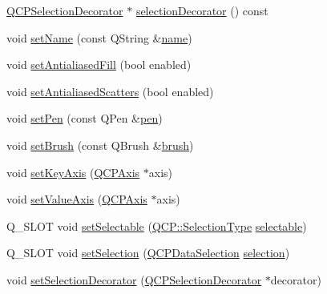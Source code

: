 \begin{DoxyCompactItemize}
\item 
\mbox{\hyperlink{class_q_c_p_selection_decorator}{Q\+C\+P\+Selection\+Decorator}} $\ast$ \mbox{\hyperlink{class_q_c_p_abstract_plottable_a7861518e47ca0c6a0c386032c2db075e}{selection\+Decorator}} () const
\item 
void \mbox{\hyperlink{class_q_c_p_abstract_plottable_ab79c7ba76bc7fa89a4b3580e12149f1f}{set\+Name}} (const Q\+String \&\mbox{\hyperlink{class_q_c_p_abstract_plottable_a52c226eefcb1920240eeabae574d28c0}{name}})
\item 
void \mbox{\hyperlink{class_q_c_p_abstract_plottable_a089d6b5577120239b55c39ed27c39536}{set\+Antialiased\+Fill}} (bool enabled)
\item 
void \mbox{\hyperlink{class_q_c_p_abstract_plottable_a2f03f067ede2ed4da6f7d0e4777a3f02}{set\+Antialiased\+Scatters}} (bool enabled)
\item 
void \mbox{\hyperlink{class_q_c_p_abstract_plottable_ab74b09ae4c0e7e13142fe4b5bf46cac7}{set\+Pen}} (const Q\+Pen \&\mbox{\hyperlink{class_q_c_p_abstract_plottable_ad5972efc31344e5a7a78ab4f8864b2d3}{pen}})
\item 
void \mbox{\hyperlink{class_q_c_p_abstract_plottable_a7a4b92144dca6453a1f0f210e27edc74}{set\+Brush}} (const Q\+Brush \&\mbox{\hyperlink{class_q_c_p_abstract_plottable_a893b4896dfd92b68b05b2600b80f5826}{brush}})
\item 
void \mbox{\hyperlink{class_q_c_p_abstract_plottable_a8524fa2994c63c0913ebd9bb2ffa3920}{set\+Key\+Axis}} (\mbox{\hyperlink{class_q_c_p_axis}{Q\+C\+P\+Axis}} $\ast$axis)
\item 
void \mbox{\hyperlink{class_q_c_p_abstract_plottable_a71626a07367e241ec62ad2c34baf21cb}{set\+Value\+Axis}} (\mbox{\hyperlink{class_q_c_p_axis}{Q\+C\+P\+Axis}} $\ast$axis)
\item 
Q\+\_\+\+S\+L\+OT void \mbox{\hyperlink{class_q_c_p_abstract_plottable_ac238d6e910f976f1f30d41c2bca44ac3}{set\+Selectable}} (\mbox{\hyperlink{namespace_q_c_p_ac6cb9db26a564b27feda362a438db038}{Q\+C\+P\+::\+Selection\+Type}} \mbox{\hyperlink{class_q_c_p_abstract_plottable_a016653741033bd332d1d4c3c725cc284}{selectable}})
\item 
Q\+\_\+\+S\+L\+OT void \mbox{\hyperlink{class_q_c_p_abstract_plottable_a219bc5403a9d85d3129165ec3f5ae436}{set\+Selection}} (\mbox{\hyperlink{class_q_c_p_data_selection}{Q\+C\+P\+Data\+Selection}} \mbox{\hyperlink{class_q_c_p_abstract_plottable_a040bf09f41d456284cfd39cc37aa068f}{selection}})
\item 
void \mbox{\hyperlink{class_q_c_p_abstract_plottable_a20e266ad646f8c4a7e4631040510e5d9}{set\+Selection\+Decorator}} (\mbox{\hyperlink{class_q_c_p_selection_decorator}{Q\+C\+P\+Selection\+Decorator}} $\ast$decorator)

\end{DoxyCompactItemize}
